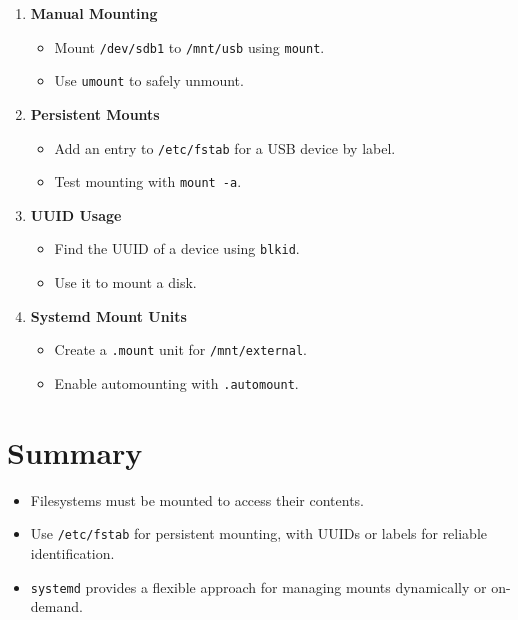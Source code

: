 \documentclass[a4paper]{report}
\begin{document}
\begin{enumerate}
    \item \textbf{Manual Mounting}
    \begin{itemize}
        \item Mount \texttt{/dev/sdb1} to \texttt{/mnt/usb} using \texttt{mount}.
        \item Use \texttt{umount} to safely unmount.
    \end{itemize}

    \item \textbf{Persistent Mounts}
    \begin{itemize}
        \item Add an entry to \texttt{/etc/fstab} for a USB device by label.
        \item Test mounting with \texttt{mount -a}.
    \end{itemize}

    \item \textbf{UUID Usage}
    \begin{itemize}
        \item Find the UUID of a device using \texttt{blkid}.
        \item Use it to mount a disk.
    \end{itemize}

    \item \textbf{Systemd Mount Units}
    \begin{itemize}
        \item Create a \texttt{.mount} unit for \texttt{/mnt/external}.
        \item Enable automounting with \texttt{.automount}.
    \end{itemize}
\end{enumerate}

\section*{Summary}
\begin{itemize}
    \item Filesystems must be mounted to access their contents.
    \item Use \texttt{/etc/fstab} for persistent mounting, with UUIDs or labels for reliable identification.
    \item \texttt{systemd} provides a flexible approach for managing mounts dynamically or on-demand.
\end{itemize}


\newpage
\end{document}
